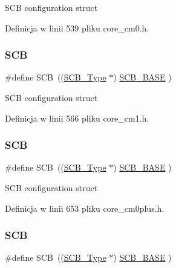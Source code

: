S\+CB configuration struct 

Definicja w linii 539 pliku core\+\_\+cm0.\+h.

\mbox{\label{group___c_m_s_i_s__core__base_gaaaf6477c2bde2f00f99e3c2fd1060b01}} 
\subsubsection{\texorpdfstring{S\+CB}{SCB}\hspace{0.1cm}{\footnotesize\ttfamily [2/12]}}
{\footnotesize\ttfamily \#define S\+CB~((\hyperlink{struct_s_c_b___type}{S\+C\+B\+\_\+\+Type}       $\ast$)     \hyperlink{group___c_m_s_i_s__core__base_gad55a7ddb8d4b2398b0c1cfec76c0d9fd}{S\+C\+B\+\_\+\+B\+A\+SE}      )}

S\+CB configuration struct 

Definicja w linii 566 pliku core\+\_\+cm1.\+h.

\mbox{\label{group___c_m_s_i_s__core__base_gaaaf6477c2bde2f00f99e3c2fd1060b01}} 
\subsubsection{\texorpdfstring{S\+CB}{SCB}\hspace{0.1cm}{\footnotesize\ttfamily [3/12]}}
{\footnotesize\ttfamily \#define S\+CB~((\hyperlink{struct_s_c_b___type}{S\+C\+B\+\_\+\+Type}       $\ast$)     \hyperlink{group___c_m_s_i_s__core__base_gad55a7ddb8d4b2398b0c1cfec76c0d9fd}{S\+C\+B\+\_\+\+B\+A\+SE}      )}

S\+CB configuration struct 

Definicja w linii 653 pliku core\+\_\+cm0plus.\+h.

\mbox{\label{group___c_m_s_i_s__core__base_gaaaf6477c2bde2f00f99e3c2fd1060b01}} 
\subsubsection{\texorpdfstring{S\+CB}{SCB}\hspace{0.1cm}{\footnotesize\ttfamily [4/12]}}
{\footnotesize\ttfamily \#define S\+CB~((\hyperlink{struct_s_c_b___type}{S\+C\+B\+\_\+\+Type}       $\ast$)     \hyperlink{group___c_m_s_i_s__core__base_gad55a7ddb8d4b2398b0c1cfec76c0d9fd}{S\+C\+B\+\_\+\+B\+A\+SE}      )}

